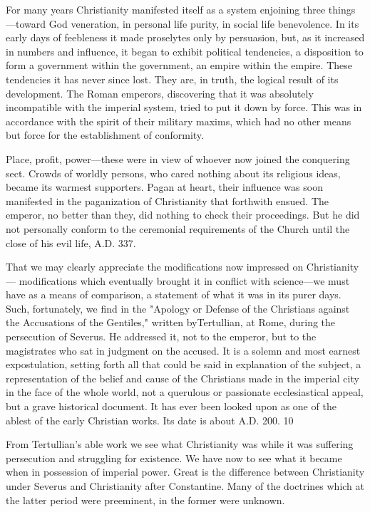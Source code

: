 For many years Christianity manifested itself as a system enjoining three things—toward
God veneration, in personal life purity, in social life benevolence. In its early days of
feebleness it made proselytes only by persuasion, but, as it increased in numbers and
influence, it began to exhibit political tendencies, a disposition to form a government within
the government, an empire within the empire. These tendencies it has never since lost. They
are, in truth, the logical result of its development. The Roman emperors, discovering that it
was absolutely incompatible with the imperial system, tried to put it down by force. This was
in accordance with the spirit of their military maxims, which had no other means but force
for the establishment of conformity.

Place, profit, power—these were in view of whoever now joined the conquering sect. Crowds
of worldly persons, who cared nothing about its religious ideas, became its warmest
supporters. Pagan at heart, their influence was soon manifested in the paganization of
Christianity that forthwith ensued. The emperor, no better than they, did nothing to check
their proceedings. But he did not personally conform to the ceremonial requirements of the
Church until the close of his evil life, A.D. 337.

That we may clearly appreciate the modifications now impressed on Christianity—
modifications which eventually brought it in conflict with science—we must have as a means
of comparison, a statement of what it was in its purer days. Such, fortunately, we find in the
"Apology or Defense of the Christians against the Accusations of the Gentiles," written byTertullian, at Rome, during the persecution of Severus. He addressed it, not to the emperor,
but to the magistrates who sat in judgment on the accused. It is a solemn and most earnest
expostulation, setting forth all that could be said in explanation of the subject, a
representation of the belief and cause of the Christians made in the imperial city in the face
of the whole world, not a querulous or passionate ecclesiastical appeal, but a grave historical
document. It has ever been looked upon as one of the ablest of the early Christian works. Its
date is about A.D. 200. 10

From Tertullian's able work we see what Christianity was while it was suffering persecution
and struggling for existence. We have now to see what it became when in possession of
imperial power. Great is the difference between Christianity under Severus and Christianity
after Constantine. Many of the doctrines which at the latter period were preeminent, in the
former were unknown.

